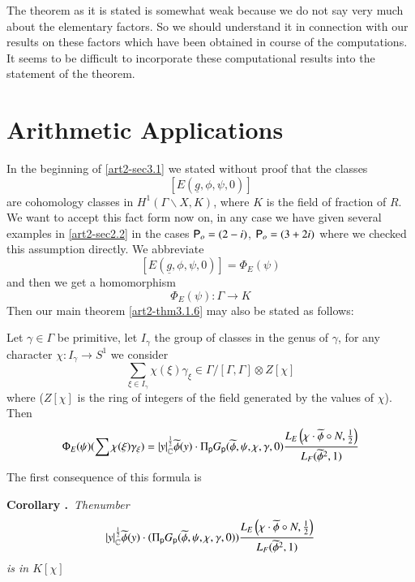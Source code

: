 \begin{remark*}
The theorem as it is stated is somewhat weak because we do not say very much about the elementary factors. So we should understand it in connection with our results on these factors which have been obtained in course of the computations. It seems to be difficult to incorporate these computational results into the statement of the theorem.
\end{remark*}

\section{Arithmetic Applications}\label{art2-sec4}

In the beginning of \ref{art2-sec3.1} we stated without proof that the classes 
$$
[E(\underline{g},\phi,\psi,0)]
$$ 
are cohomology classes in $H^{1}(\Gamma\backslash X,K)$, where $K$ is the field of fraction of $R$. We want to accept this fact form now on, in any case we have given several examples in \ref{art2-sec2.2} in the cases $\mathsf{P}_{o}=(2-i)$, $\mathsf{P}_{o}=(3+2i)$ where we checked this assumption directly. We abbreviate
$$
[E(\underline{g},\phi,\psi,0)]=\Phi_{E}(\psi)
$$
and then we get a homomorphism
$$
\Phi_{E}(\psi):\Gamma\to K
$$
Then our main theorem \ref{art2-thm3.1.6} may also be stated as follows:

Let $\gamma\in \Gamma$ be primitive, let $I_{\gamma}$ the group of classes in the genus of $\gamma$, for any character $\chi:I_{\gamma}\to S^{1}$ we consider
$$
\sum\limits_{\xi\in I_{\gamma}}\chi(\xi)\gamma_{\xi}\in \Gamma/[\Gamma,\Gamma]\otimes Z[\chi]
$$
where ($Z[\chi]$ is the ring of integers of the field generated by the values of $\chi$). Then
$$
\Phi_{E}(\psi)(\sum \chi(\xi)\gamma_{\xi})=|y|_{\mathbb{C}}^{\frac{1}{2}}\widetilde{\phi}(y)\cdot \Pi_{\mathsf{p}}G_{\mathsf{p}}(\widetilde{\phi},\psi,\chi,\gamma,0)\frac{L_{E}\left(\chi\cdot \widetilde{\phi}\circ N,\frac{1}{2}\right)}{L_{F}(\widetilde{\phi}^{2},1)}
$$
The first consequence of this formula is

\medskip
\noindent
{\bf Corollary .\label{art2-coro4.1}}~{\em The\pageoriginale number}
$$
|y|^{\frac{1}{2}}_{\mathbb{C}}\widetilde{\phi}(y)\cdot (\Pi_{\mathsf{p}}G_{\mathsf{p}}(\widetilde{\phi},\psi,\chi,\gamma,0))\frac{L_{E}\left(\chi\cdot \widetilde{\phi}\circ N,\frac{1}{2}\right)}{L_{F}(\widetilde{\phi}^{2},1)}
$$
{\em is in $K[\chi]$}
\smallskip


